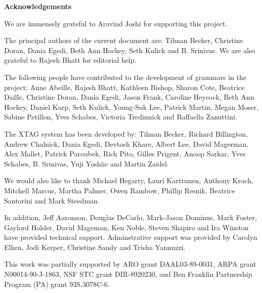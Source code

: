 \pagestyle{plain}
\null\vfil
\begin{center}
{\bf Acknowledgements}
\end{center}
\setcounter{page}{0}

We are immensely grateful to Aravind Joshi for supporting this
project. 

The principal authors of the current document are: Tilman Becker,
Christine Doran, Dania Egedi, Beth Ann Hockey, Seth Kulick and
B. Srinivas. We are also grateful to Rajesh Bhatt for editorial help.

The following people have contributed to the development of grammars
in the project: Anne Abeille, Rajesh Bhatt, Kathleen Bishop, Sharon
Cote, Beatrice Daille, Christine Doran, Dania Egedi, Jason Frank,
Caroline Heycock, Beth Ann Hockey, Daniel Karp, Seth Kulick, Young-Suk
Lee, Patrick Martin, Megan Moser, Sabine Petillon, Yves Schabes,
Victoria Tredinnick and Raffaella Zanuttini.

The XTAG system has been developed by: Tilman Becker, Richard
Billington, Andrew Chalnick, Dania Egedi, Devtosh Khare, Albert Lee,
David Magerman, Alex Mallet, Patrick Paroubek, Rich Pito, Gilles
Prigent, Anoop Sarkar, Yves Schabes, B. Srinivas, Yuji Yoshiie and
Martin Zaidel. 

We would also like to thank Michael Hegarty, Lauri Karttunen, Anthony Kroch,
Mitchell Marcus, Martha Palmer, Owen Rambow, Phillip Resnik, Beatrice Santorini
and Mark Steedman.

In addition, Jeff Aaronson, Douglas DeCarlo, Mark-Jason Dominus, Mark Foster,
Gaylord Holder, David Mageman, Ken Noble, Steven Shapiro and Ira Winston have
provided technical support.  Adminstrative support was provided by Carolyn
Elken, Jodi Kerper, Christine Sandy and Trisha Yannuzzi.  

This work was partially supported by ARO grant DAAL03-89-0031, ARPA
grant N00014-90-J-1863, NSF STC grant DIR-8920230, and Ben Franklin
Partnership Program (PA) grant 93S.3078C-6. 

\newpage

